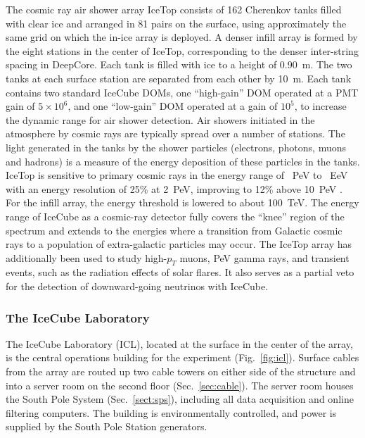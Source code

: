The cosmic ray air shower array IceTop \cite{ICECUBE:IceTop} consists
of \num{162} Cherenkov tanks filled with clear ice and arranged in
\num{81} pairs on the
surface, using approximately the same grid on which the in-ice
array is deployed. A denser infill array is formed by the eight
stations in the center of IceTop, corresponding to the denser
inter-string spacing
in DeepCore. Each tank is filled with ice to a height of \SI{0.90}{\meter}.  The two tanks at each surface station are separated from
each other by \SI{10}{\meter}. Each tank contains two standard IceCube
DOMs, one ``high-gain'' DOM operated at a PMT gain of $5 \times 10^{6}$, and one
``low-gain'' DOM operated at a gain of $10^{5}$, to increase the dynamic range for air shower detection. Air showers initiated in the atmosphere by cosmic rays are typically
spread over a number of stations. The light generated in the tanks by the
shower particles (electrons, photons, muons and hadrons) is a measure of
the energy deposition of these particles in the tanks. IceTop is sensitive to
primary cosmic rays in the energy range of \SI{}{PeV} to \SI{}{EeV}
with an energy resolution of 25\% at \SI{2}{PeV}, improving to 12\% above \SI{10}{PeV} \cite{IT:measurement}. For the infill
array, the energy threshold is lowered to about \SI{100}{TeV}. The energy
range of IceCube as a cosmic-ray detector fully covers the ``knee'' region
of the spectrum and extends to the energies where a transition from
Galactic cosmic rays to a population of extra-galactic 
particles may occur. The IceTop array has additionally been used to study
high-$p_T$ muons, PeV gamma rays, and transient events, such as the
radiation effects of solar flares. It also serves as a partial veto for the
detection of downward-going neutrinos with IceCube.   

\subsubsection{The IceCube Laboratory}

The IceCube Laboratory (ICL), located at the surface in the center
of the array, is the central operations building for the experiment
(Fig.~\ref{fig:icl}). Surface cables from the array are routed up two cable
towers on either side of the structure and into a server room on the second
floor (Sec.~\ref{sec:cable}). The server room houses the South Pole System
(Sec.~\ref{sect:sps}), including all data acquisition and online filtering
computers.  The building is environmentally controlled, and power is
supplied by the South Pole Station generators.

